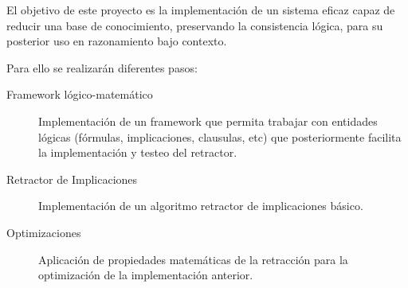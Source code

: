 	El objetivo de este proyecto es la implementación de un sistema eficaz capaz de reducir una base de conocimiento, preservando la consistencia lógica, para su posterior uso en razonamiento bajo contexto. 
	
	Para ello se realizarán diferentes pasos:

	\begin{description}
	
		\item[Framework lógico-matemático]
			Implementación de un framework que permita trabajar con entidades lógicas (fórmulas, implicaciones, clausulas, etc)
			que posteriormente facilita la implementación y testeo del retractor.
		
		\item[Retractor de Implicaciones]
			Implementación de un algoritmo retractor de implicaciones básico.
		
		\item[Optimizaciones]
			Aplicación de propiedades matemáticas de la retracción para la optimización de la implementación anterior.
			
	\end{description}

 